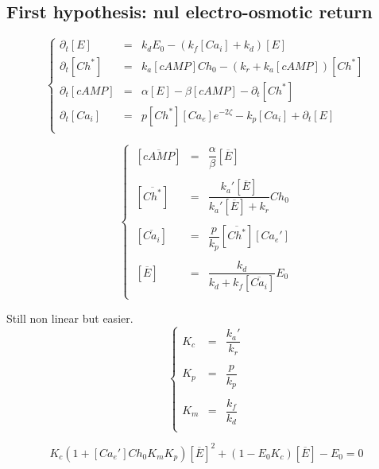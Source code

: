 \documentclass[aps,12pt]{revtex4}
\begin{document}
\subsection{First hypothesis: nul electro-osmotic return}

\begin{equation}
\left\lbrace
\begin{array}{lcl}
\partial_t [E] & = & k_d E_0 - (k_f[Ca_i]+k_d)[E]\\
\partial_t [Ch^\ast] & = & k_a [cAMP] Ch_0 - (k_r+k_a[cAMP]) [Ch^\ast]\\
\partial_t [cAMP]    & = & \alpha [E] - \beta [cAMP] - \partial_t [Ch^\ast] \\
\partial_t [Ca_i]    & = & p [Ch^\ast] [Ca_e] e^{-2\zeta}  - k_p [Ca_i] + \partial_t [E]\\
\end{array}
\right.
\end{equation}

\begin{equation}
\left\lbrace
\begin{array}{lcl}
~[\overline{cAMP}] & = & \dfrac{\alpha}{\beta}[\overline{E}] \\
\\
~[ \overline{Ch^\ast} ] & = & \dfrac{k_a'[\overline{E}]}{k_a'[\overline{E}]+k_r} Ch_0\\
\\
~[\overline{Ca_i}] & = & \dfrac{p}{k_p}[\overline{Ch^\ast}] [Ca_e']\\
\\
~[\overline{E}] & = & \dfrac{k_d}{k_d+k_f[\overline{Ca_i}]} E_0\\
\end{array}
\right.
\end{equation}

Still non linear but easier.
\begin{equation}
\left\lbrace
\begin{array}{lcl}
K_c & = & \dfrac{k_a'}{k_r} \\
\\
K_p & = & \dfrac{p}{k_p} \\
\\
K_m & = & \dfrac{k_f}{k_d}\\
\end{array}
\right.
\end{equation}

\begin{equation}
K_c(1+[Ca_e'] Ch_0 K_m K_p) [\overline{E}]^2 + (1-E_0K_c) [\overline{E}] - E_0 = 0
\end{equation}
\end{document}
